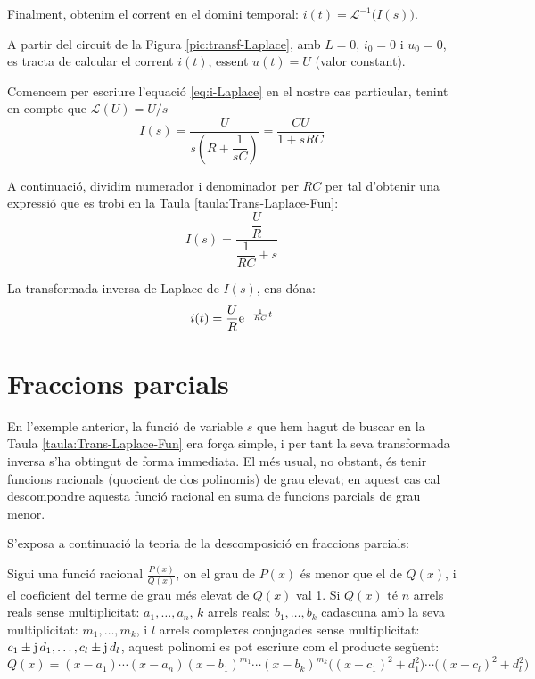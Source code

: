 Finalment, obtenim el corrent en el domini temporal: $i(t) =
\mathcal{L}^{-1}\bigl(I(s)\bigr)$.

\begin{exemple}

A partir del circuit de la Figura \vref{pic:transf-Laplace}, amb
$L=0$, $i_0=0$ i $u_0=0$, es tracta de calcular el corrent $i(t)$,
essent $u(t)=U$ (valor constant).

Comencem per escriure l'equaci\'{o} \eqref{eq:i-Laplace} en el nostre
cas particular, tenint en compte que $\mathcal{L}(U) = U/s$
\[
    I(s) = \frac{U}{s\left(R + \dfrac{1}{s C}\right)} = \frac{C U}{1 + s R C}
\]

A continuaci\'{o}, dividim numerador i denominador per $R C$ per tal
d'obtenir una expressi\'{o} que es trobi en la Taula
\vref{taula:Trans-Laplace-Fun}:
\[
    I(s) = \frac{\dfrac{U}{R}}{\dfrac{1}{R C} + s}
\]

La transformada inversa de Laplace de $I(s)$, ens d\'{o}na:
\[
    i(t) = \frac{U}{R} \mathrm{e}^{-\frac{1}{R C}t}
\]

\end{exemple}

\section{Fraccions parcials}

En l'exemple anterior, la funci\'{o} de variable $s$ que hem hagut de
buscar en la Taula \vref{taula:Trans-Laplace-Fun} era for\c{c}a simple, i
per tant la seva transformada inversa s'ha obtingut de forma
immediata. El m\'{e}s usual, no obstant, \'{e}s tenir funcions racionals
(quocient de dos polinomis) de grau elevat; en aquest cas cal
descompondre aquesta funci\'{o} racional en suma de funcions parcials de
grau menor.

S'exposa a continuaci\'{o} la teoria de la descomposici\'{o} en fraccions
parcials:

Sigui una funci\'{o} racional $\frac{P(x)}{Q(x)}$, on el grau de $P(x)$
\'{e}s menor que el de $Q(x)$, i el coeficient del terme de grau m\'{e}s
elevat de $Q(x)$ val 1. Si $Q(x)$ t\'{e} $n$ arrels reals sense
multiplicitat: $a_1,\ldots,a_n$, $k$ arrels reals: $b_1,\ldots,b_k$
cadascuna amb la seva multiplicitat: $m_1,\ldots,m_k$, i $l$ arrels
complexes conjugades sense multiplicitat: $c_1\pm
\mathrm{j}\,d_1,\ldots,c_l\pm \mathrm{j}\,d_l$, aquest polinomi es pot escriure
com el producte seg\"{u}ent:
\begin{equation}
    Q(x)= (x-a_1) \cdots (x-a_n)(x-b_1)^{m_1} \cdots (x-b_k)^{m_k}
    \bigl((x-c_1)^2+d_1^2\bigr)\cdots\bigl((x-c_l)^2+d_l^2\bigr)
\end{equation}

